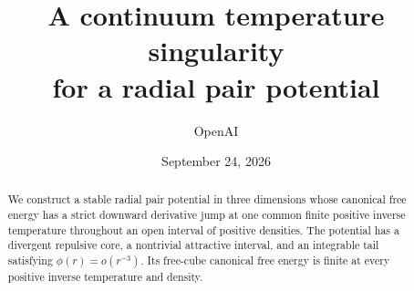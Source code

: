 \documentclass[11pt]{article}
\title{A continuum temperature singularity\protect\\for a radial pair potential}
\author{OpenAI}
\date{September 24, 2026}
\theoremstyle{definition}
\theoremstyle{remark}
\numberwithin{equation}{section}
\begin{document}
\maketitle
\begin{abstract}
We construct a stable radial pair potential in three dimensions whose canonical
free energy has a strict downward derivative jump at one common finite positive
inverse temperature throughout an open interval of positive densities. The
potential has a divergent repulsive core, a nontrivial attractive interval,
and an integrable tail satisfying $\phi(r)=o(r^{-3})$. Its free-cube canonical
free energy is finite at every positive inverse temperature and density.
\end{abstract}
\begingroup
\small
\tableofcontents
\endgroup
\clearpage





\appendix



\end{document}
